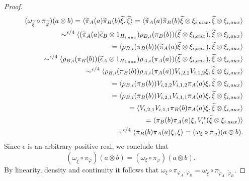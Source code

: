 \documentclass[10pt,a4paper]{amsart}
\providecommand{\wt}[1]{\widetilde{#1}}
\begin{document}
\begin{proof}
\begin{eqnarray*}
    &&
    (\omega_{\wt{\xi}}\circ\pi_{\wt{\varphi}})(a\otimes b)
    =
    \langle \wt{\pi}_A(a)\wt{\pi}_B(b)\wt{\xi},\wt{\xi}\rangle
    =
    \langle \wt{\pi}_A(a)\wt{\pi}_B(b)\wt{\xi}\otimes\xi_{i,{\rm aux}},\wt{\xi}\otimes\xi_{i,{\rm aux}}\rangle\\
    && \sim^{\epsilon/4}
    \langle (\wt{\pi}_A(a)\wt{\epsilon}_B\otimes 1_{H_{i,{\rm aux}}})\rho_{B,i}(\pi_B(b))(\wt{\xi}\otimes\xi_{i,{\rm aux}}), \wt{\xi}\otimes\xi_{i,{\rm aux}}\rangle\\
    && =
    \langle \rho_{B,i}(\pi_B(b))(\wt{\pi}_A(a)\wt{\xi}\otimes\xi_{i,{\rm aux}}), \wt{\xi}\otimes\xi_{i,{\rm aux}}\rangle\\
    && \sim^{\epsilon/4}
    \langle \rho_{B,i}(\pi_B(b))
    (\wt{\epsilon}_A\otimes 1_{H_{i,{\rm aux}}})\rho_{A,i}(\pi_A(a))
    (\wt{\xi}\otimes\xi_{i,{\rm aux}}), 
    \wt{\xi}\otimes\xi_{i,{\rm aux}}\rangle\\
    && \sim^{\epsilon/4}
    \langle \rho_{B,i}(\pi_B(b))\rho_{A,i}(\pi_A(a))V_{i,2,2}V_{i,1,2}\xi, \wt{\xi}\otimes\xi_{i,{\rm aux}}\rangle\\
    && =
    \langle \rho_{B,i}(\pi_B(b))V_{i,2,2}V_{i,1,2}\pi_A(a)\xi, \wt{\xi}\otimes\xi_{i,{\rm aux}}\rangle\\
    && =
    \langle \rho_{B,i}(\pi_B(b))V_{i,2,1}V_{i,1,1}\pi_A(a)\xi, \wt{\xi}\otimes\xi_{i,{\rm aux}}\rangle\\
    && =
    \langle V_{i,2,1}V_{i,1,1} \pi_B(b)\pi_A(a)\xi, \wt{\xi}\otimes\xi_{i,{\rm aux}}\rangle\\
    && = 
    \langle \pi_B(b)\pi_A(a)\xi, V_i^*(\wt{\xi}\otimes\xi_{i,{\rm aux}})\rangle\\
    && \sim^{\epsilon/4}
    \langle \pi_B(b)\pi_A(a)\xi, \xi\rangle
    = 
    (\omega_\xi\circ\pi_\varphi)(a\otimes b).
    \end{eqnarray*}
Since $\epsilon$ is an arbitrary positive real, we conclude that 
$$(\omega_{\wt{\xi}}\circ\pi_{\wt{\varphi}})(a\otimes b) = (\omega_\xi\circ\pi_\varphi)(a\otimes b).$$
By linearity, density and continuity it follows that $\omega_\xi\circ\pi_{\varphi_A\cdot\varphi_B}
 = \omega_{\wt{\xi}}\circ\pi_{\wt{\varphi}_A\cdot\wt{\varphi}_B}$.
\end{proof}
\end{document}
